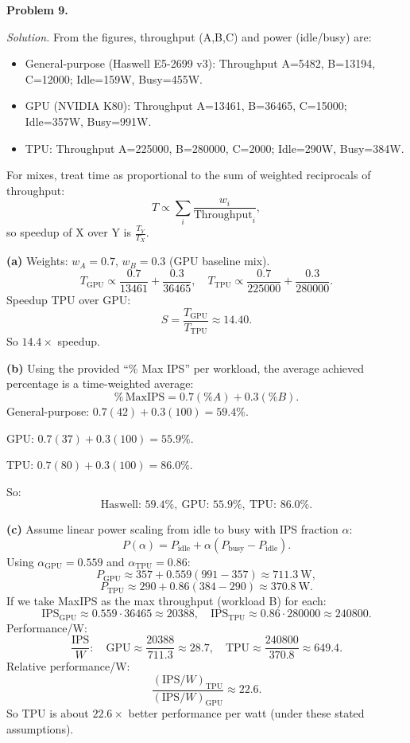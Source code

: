 \documentclass[12pt]{article}
\newcommand{\problem}[1]{\vspace{0.5em}\noindent\textbf{Problem #1.}\vspace{0.3em}}
\newenvironment{solution}{\par\noindent\textit{Solution.}}{\par\vspace{1em}}
\newcommand{\subproblem}[1]{\par\noindent\textbf{(#1)}\quad}
\begin{document}
\problem{9}
\begin{solution}
From the figures, throughput (A,B,C) and power (idle/busy) are:

\begin{itemize}
\item General-purpose (Haswell E5-2699 v3): Throughput A=5482, B=13194, C=12000; Idle=159W, Busy=455W.
\item GPU (NVIDIA K80): Throughput A=13461, B=36465, C=15000; Idle=357W, Busy=991W.
\item TPU: Throughput A=225000, B=280000, C=2000; Idle=290W, Busy=384W.
\end{itemize}

For mixes, treat time as proportional to the sum of weighted reciprocals of throughput:
\[
T \propto \sum_i \frac{w_i}{\text{Throughput}_i},
\]
so speedup of X over Y is \(\frac{T_Y}{T_X}\).

\subproblem{a}
Weights: $w_A=0.7$, $w_B=0.3$ (GPU baseline mix).
\[
T_{\text{GPU}} \propto \frac{0.7}{13461}+\frac{0.3}{36465},\quad
T_{\text{TPU}} \propto \frac{0.7}{225000}+\frac{0.3}{280000}.
\]
Speedup TPU over GPU:
\[
S=\frac{T_{\text{GPU}}}{T_{\text{TPU}}}\approx 14.40.
\]
So \(\boxed{14.4\times}\) speedup.

\subproblem{b}
Using the provided ``\% Max IPS'' per workload, the average achieved percentage is a time-weighted average:
\[
\%\,\text{MaxIPS} = 0.7(\%A)+0.3(\%B).
\]
General-purpose: $0.7(42)+0.3(100)=59.4\%$.

GPU: $0.7(37)+0.3(100)=55.9\%$.

TPU: $0.7(80)+0.3(100)=86.0\%$.

So:
\[
\boxed{\text{Haswell: }59.4\%,\ \text{GPU: }55.9\%,\ \text{TPU: }86.0\%.}
\]

\subproblem{c}
Assume linear power scaling from idle to busy with IPS fraction $\alpha$:
\[
P(\alpha)=P_{\text{idle}}+\alpha(P_{\text{busy}}-P_{\text{idle}}).
\]
Using $\alpha_{\text{GPU}}=0.559$ and $\alpha_{\text{TPU}}=0.86$:
\[
P_{\text{GPU}}\approx 357+0.559(991-357)\approx 711.3\ \text{W},
\]
\[
P_{\text{TPU}}\approx 290+0.86(384-290)\approx 370.8\ \text{W}.
\]
If we take MaxIPS as the max throughput (workload B) for each:
\[
\text{IPS}_{\text{GPU}}\approx 0.559\cdot 36465 \approx 20388,
\quad
\text{IPS}_{\text{TPU}}\approx 0.86\cdot 280000 \approx 240800.
\]
Performance/W:
\[
\frac{\text{IPS}}{W}:\quad
\text{GPU}\approx \frac{20388}{711.3}\approx 28.7,\quad
\text{TPU}\approx \frac{240800}{370.8}\approx 649.4.
\]
Relative performance/W:
\[
\frac{(\text{IPS}/W)_{\text{TPU}}}{(\text{IPS}/W)_{\text{GPU}}}\approx 22.6.
\]
So TPU is about \(\boxed{22.6\times}\) better performance per watt (under these stated assumptions).


\end{solution}
\end{document}
